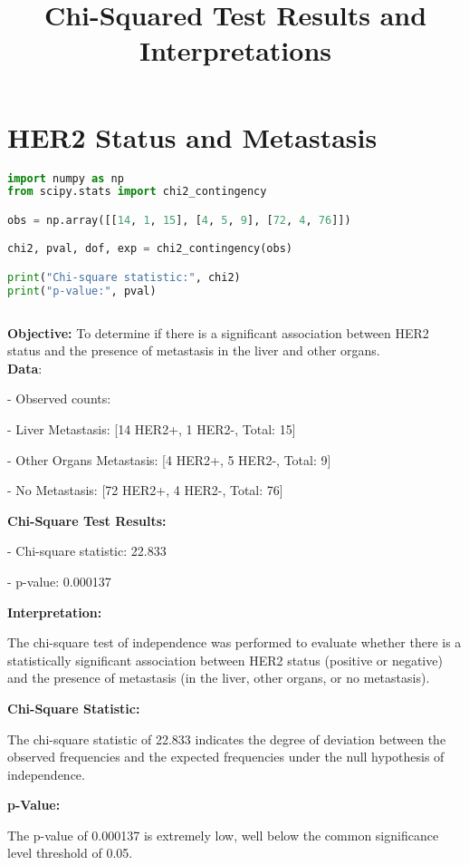 \documentclass[12 px]{article}
\title{\huge Chi-Squared Test Results and Interpretations}
\begin{document}
\maketitle

\section*{HER2 Status and Metastasis}
\begin{lstlisting}[language=Python, breaklines=true]
import numpy as np
from scipy.stats import chi2_contingency

obs = np.array([[14, 1, 15], [4, 5, 9], [72, 4, 76]])

chi2, pval, dof, exp = chi2_contingency(obs)

print("Chi-square statistic:", chi2)
print("p-value:", pval)
        
\end{lstlisting}

\textbf{Objective:} To determine if there is a significant association between HER2 status and the presence of metastasis in the liver and other organs.\\[5px]

\textbf{Data}:

- Observed counts:

  - Liver Metastasis: [14 HER2+, 1 HER2-, Total: 15]
  
  - Other Organs Metastasis: [4 HER2+, 5 HER2-, Total: 9]
  
  - No Metastasis: [72 HER2+, 4 HER2-, Total: 76]
  

\textbf{Chi-Square Test Results:}

- Chi-square statistic: 22.833

- p-value: 0.000137


\textbf{Interpretation:}

The chi-square test of independence was performed to evaluate whether there is a 
statistically significant association between HER2 status (positive or negative) 
and the presence of metastasis (in the liver, other organs, or no metastasis).


\textbf{Chi-Square Statistic:}

The chi-square statistic of 22.833 indicates the degree of deviation between the observed frequencies and the expected frequencies under the null hypothesis of independence. 

\textbf{p-Value:}
 
The p-value of 0.000137 is extremely low, well below the common significance level threshold of 0.05. 
\end{document}
